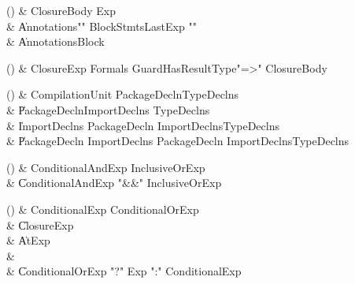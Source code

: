 \begin{bbgrammarappendix}

() & ClosureBody \label{prod:ClosureBody}  \: Exp  \\

 &    \| Annotations\opt \xcd"{" BlockStmts\opt LastExp \xcd"}" \\
 &    \| Annotations\opt Block \\

\end{bbgrammarappendix}

\begin{bbgrammarappendix}

() & ClosureExp \label{prod:ClosureExp}  \: Formals Guard\opt HasResultType\opt \xcd"=>" ClosureBody  \\


\end{bbgrammarappendix}

\begin{bbgrammarappendix}

() & CompilationUnit \label{prod:CompilationUnit}  \: PackageDecln\opt TypeDeclns\opt  \\

 &    \| PackageDecln\opt ImportDeclns TypeDeclns\opt \\
 &    \| ImportDeclns PackageDecln  ImportDeclns\opt  TypeDeclns\opt \\
 &    \| PackageDecln ImportDeclns PackageDecln  ImportDeclns\opt  TypeDeclns\opt \\

\end{bbgrammarappendix}

\begin{bbgrammarappendix}

() & ConditionalAndExp \label{prod:ConditionalAndExp}  \: InclusiveOrExp  \\

 &    \| ConditionalAndExp \xcd"&&" InclusiveOrExp \\

\end{bbgrammarappendix}

\begin{bbgrammarappendix}

() & ConditionalExp \label{prod:ConditionalExp}  \: ConditionalOrExp  \\

 &    \| ClosureExp \\
 &    \| AtExp \\
 &    \|  \\
 &    \| ConditionalOrExp \xcd"?" Exp \xcd":" ConditionalExp \\

\end{bbgrammarappendix}


